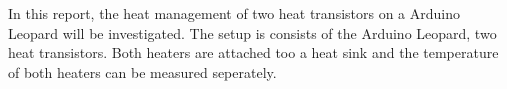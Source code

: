 In this report, the heat management of two heat transistors on a Arduino Leopard will be investigated. The setup is \cite{APMonitor} consists of the Arduino Leopard, two heat transistors. Both heaters are attached too a heat sink and  the temperature of both heaters can be measured seperately.